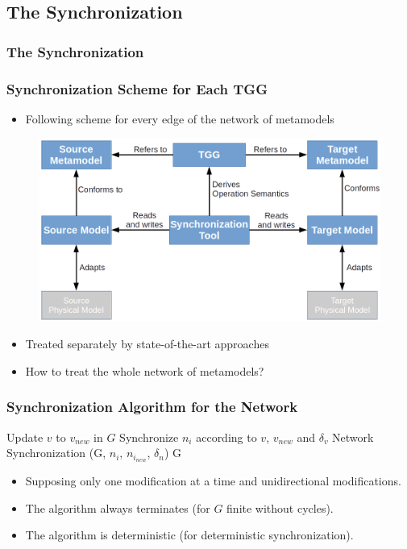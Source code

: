 \documentclass{beamer}
\begin{document}
\subsection{The Synchronization}
\begin{frame}
	\frametitle{The Synchronization}
\end{frame}

\begin{frame}[t]
	\frametitle{Synchronization Scheme for Each TGG}
	\begin{itemize}
		\item Following scheme for every edge of the network of metamodels
	\end{itemize}
	\pause
	\begin{figure}
		\includegraphics[width=.8\textwidth]{synchronization_scheme}
	\end{figure}
	\nocite{czarnecki2006feature}
	\nocite{giese2010model}
	\pause
	\begin{itemize}
		\item Treated separately by state-of-the-art approaches
		\pause
		\item How to treat the whole network of metamodels?
	\end{itemize}
\end{frame}

\begin{frame}[t]
	\frametitle{Synchronization Algorithm for the Network}
	{\footnotesize 
		\begin{algorithmic}
				\State Update $v$ to $v_{new}$ in $G$
								\State Synchronize $n_i$ according to $v$, $v_{new}$ and $\delta_v$
									\State Network Synchronization (G, $n_i$, $n_{i_{new}}$, $\delta_n$)
								\EndIf
							\EndFor
				\State \Return G
			\EndFunction
		\end{algorithmic}
	}
	\pause
	\begin{itemize}
		\item Supposing only one modification at a time and unidirectional modifications.
		\item The algorithm always terminates (for $G$ finite without cycles).
		\item The algorithm is deterministic (for deterministic synchronization).
	\end{itemize}
\end{frame}
\end{document}

